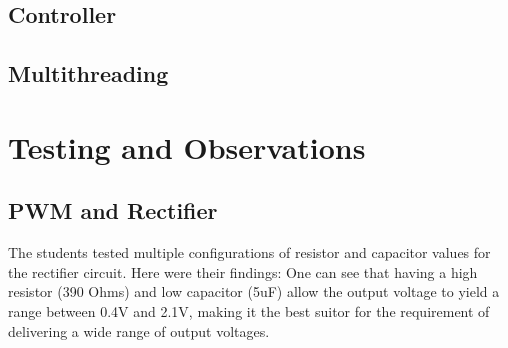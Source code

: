 \documentclass[12pt]{report}
\begin{document}
\subsection{Controller}

\subsection{Multithreading}

\section{Testing and Observations}

\subsection{PWM and Rectifier}\label{testpwm}

The students tested multiple configurations of resistor and capacitor values for the rectifier circuit. Here were their findings:
One can see that having a high resistor (390 Ohms) and low capacitor (5uF) allow the output voltage to yield a range between 0.4V and 2.1V, making it the best suitor for the requirement of delivering a wide range of output voltages.
\end{document}
